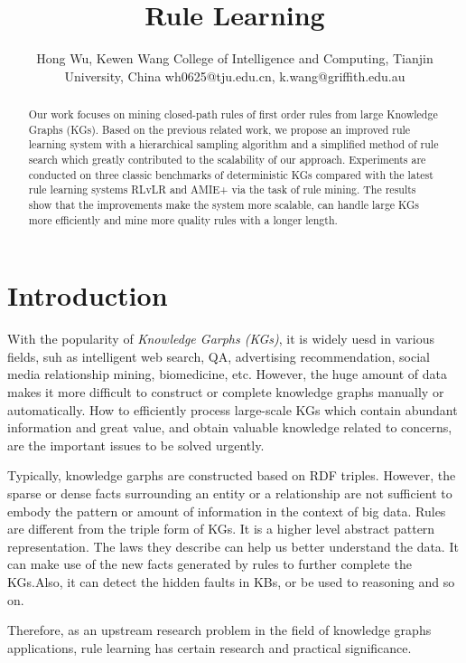 \documentclass{article}
\title{Rule Learning}
\author{
	Hong Wu, Kewen Wang
	\affiliations
	College of Intelligence and Computing, Tianjin University, China \emails
	wh0625@tju.edu.cn, k.wang@griffith.edu.au
}
\begin{document}
	\maketitle
	
	\begin{abstract}
		Our work focuses on mining closed-path rules of first order rules from large Knowledge Graphs (KGs). Based on the previous related work,  we propose an improved rule learning system with a hierarchical sampling algorithm and a simplified method of rule search which greatly contributed to the scalability of our approach. 
		Experiments are conducted on three classic benchmarks of deterministic KGs compared with the latest rule learning systems RLvLR and AMIE+ via the task of rule mining. The results show that the improvements make the system more scalable, can handle large KGs more efficiently and mine more quality rules with a longer length. 
	\end{abstract}
	
	\section{Introduction}
	With the popularity of {\em Knowledge Garphs (KGs)}, it is widely uesd in various fields, suh as  intelligent web search, QA, advertising recommendation, social media relationship mining, biomedicine, etc. 
	However, the huge amount of data makes it more difficult to construct or complete knowledge graphs manually or automatically.
	How to efficiently process large-scale KGs which contain abundant information and great value, and obtain valuable knowledge related to concerns, are the important issues to be solved urgently.
	
	Typically, knowledge garphs are constructed based on RDF triples. However, the sparse or dense facts surrounding an entity or a relationship are not sufficient to embody the pattern or amount of information in the context of big data.
	Rules are different from the triple form of KGs. It is a higher level abstract pattern representation. The laws they describe can help us better understand the data. It can make use of the new facts generated by rules to further complete the KGs.Also, it can detect the hidden faults in KBs, or be used to reasoning and so on. 
	
	Therefore, as an upstream research problem in the field of knowledge graphs applications, rule learning has certain research and practical significance.
	
\end{document}
